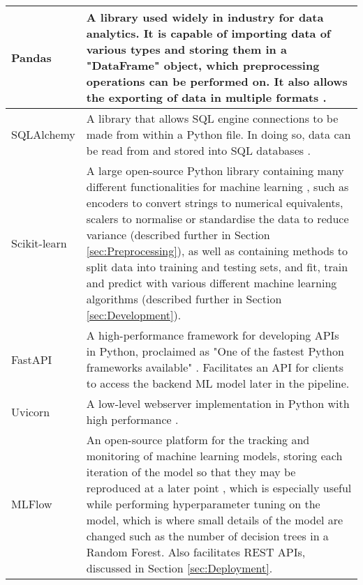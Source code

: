 \begin{longtable}{ |p{}| p{}|}
    \hline
    Pandas &
    A library used widely in industry for data analytics. It is capable of importing data of various 
    types and storing them in a "DataFrame" object, which preprocessing operations can be performed on.
    It also allows the exporting of data in multiple formats \autocite{pandas_pandas_nodate}.\\
    \hline
    SQLAlchemy &
    A library that allows SQL engine connections to be made from within a Python file. In 
    doing so, data can be read from and stored into SQL databases \autocite{sqlalchemy_sqlalchemy_nodate}.\\
    \hline
    Scikit-learn & 
    A large open-source Python library containing many different functionalities for machine learning \autocite{scikit-learn_scikit-learn_nodate}, 
    such as encoders to convert strings to numerical equivalents, scalers to normalise or standardise 
    the data to reduce variance (described further in Section \ref{sec:Preprocessing}), as well as containing 
    methods to split data into training and testing sets, and fit, train and predict with various different 
    machine learning algorithms (described further in Section \ref{sec:Development}).\\
    \hline
    FastAPI &
    A high-performance framework for developing APIs in Python, proclaimed
    as "One of the fastest Python frameworks available" \autocite{fastapi_fastapi_nodate}.
    Facilitates an API for clients to access the backend ML model later in the pipeline. \\
    \hline
    Uvicorn &
    A low-level webserver implementation in Python with high performance \autocite{uvicorn_uvicorn_nodate}.\\
    \hline
    MLFlow &
    An open-source platform for the tracking and monitoring of machine learning models, 
    storing each iteration of the model so that they may be reproduced at a later point \autocite{mlflow_mlflow_nodate},
    which is especially useful while performing hyperparameter tuning on the model, which is where 
    small details of the model are changed such as the number of decision trees in a Random Forest.
    Also facilitates REST APIs, discussed in Section \ref{sec:Deployment}.\\

\end{longtable}
